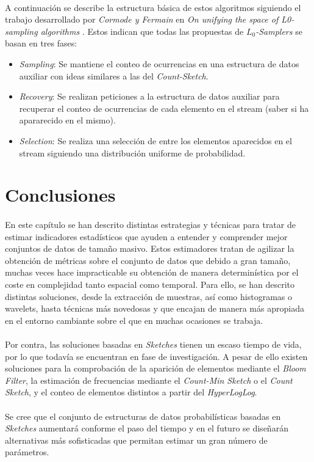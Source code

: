 \documentclass{subfiles}
\begin{document}
      \paragraph{}
      A continuación se describe la estructura básica de estos algoritmos siguiendo el trabajo desarrollado por \emph{Cormode y Fermain} en \emph{On unifying the space of L0-sampling algorithms} \cite{cormode2013unifying}. Estos indican que todas las propuestas de \emph{$L_0$-Samplers} se basan en tres fases:

      \begin{itemize}
        \item \emph{Sampling}: Se mantiene el conteo de ocurrencias en una estructura de datos auxiliar con ideas similares a las del \emph{Count-Sketch}.
        \item \emph{Recovery}: Se realizan peticiones a la estructura de datos auxiliar para recuperar el conteo de ocurrencias de cada elemento en el stream (saber si ha apararecido en el mismo).
        \item \emph{Selection}: Se realiza una selección de entre los elementos aparecidos en el stream siguiendo una distribución uniforme de probabilidad.
      \end{itemize}


    \section{Conclusiones}
    \label{sec:summaries_conclusions}

      \paragraph{}
      En este capítulo se han descrito distintas estrategias y técnicas para tratar de estimar indicadores estadísticos que ayuden a entender y comprender mejor conjuntos de datos de tamaño masivo. Estos estimadores tratan de agilizar la obtención de métricas sobre el conjunto de datos que debido a gran tamaño, muchas veces hace impracticable su obtención de manera determinística por el coste en complejidad tanto espacial como temporal. Para ello, se han descrito distintas soluciones, desde la extracción de muestras, así como histogramas o wavelets, hasta técnicas más novedosas y que encajan de manera más apropiada en el entorno cambiante sobre el que en muchas ocasiones se trabaja.

      \paragraph{}
      Por contra, las soluciones basadas en \emph{Sketches} tienen un escaso tiempo de vida, por lo que todavía se encuentran en fase de investigación. A pesar de ello existen soluciones para la comprobación de la aparición de elementos mediante el \emph{Bloom Filter}, la estimación de frecuencias mediante el \emph{Count-Min Sketch} o el \emph{Count Sketch}, y el conteo de elementos distintos a partir del \emph{HyperLogLog}.

      \paragraph{}
      Se cree que el conjunto de estructuras de datos probabilísticas basadas en \emph{Sketches} aumentará conforme el paso del tiempo y en el futuro se diseñarán alternativas más sofisticadas que permitan estimar un gran número de parámetros.
\end{document}

